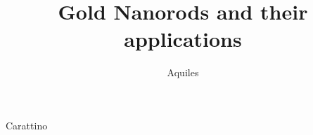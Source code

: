 \documentclass[print]{dissertation}
\begin{document}
\title[From imaging to temperature sensing]{Gold Nanorods and their
applications}
\author{Aquiles}{Carattino}

\frontmatter

%


%

\tableofcontents

\mainmatter

\thumbtrue




%
\appendix




\thumbfalse

%
%
%
\end{document}
